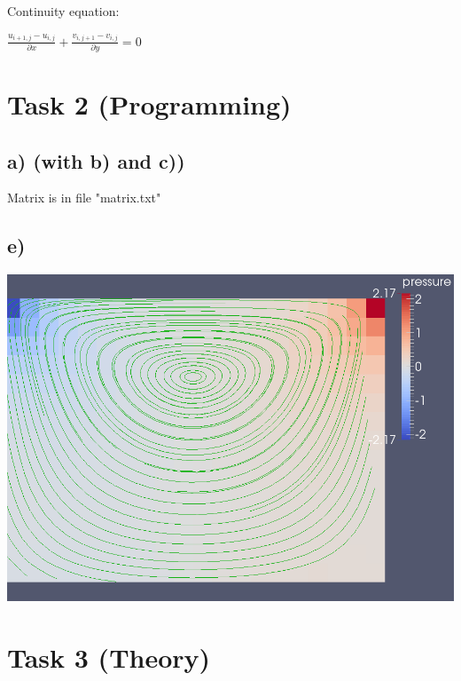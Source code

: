\documentclass[a4paper,11pt]{scrartcl}
\begin{document}
Continuity equation:

$ \frac{u_{i+1,j} - u_{i,j}}{\partial x} + \frac{v_{i,j+1} - v_{i,j}}{\partial y} = 0 $

\section{Task 2 (Programming)}

\subsection{a) (with b) and c))}

Matrix is in file "matrix.txt"
\subsection{e)}

\includegraphics[width=\textwidth]{stokes.png}


\section{Task 3 (Theory)}
\end{document}
